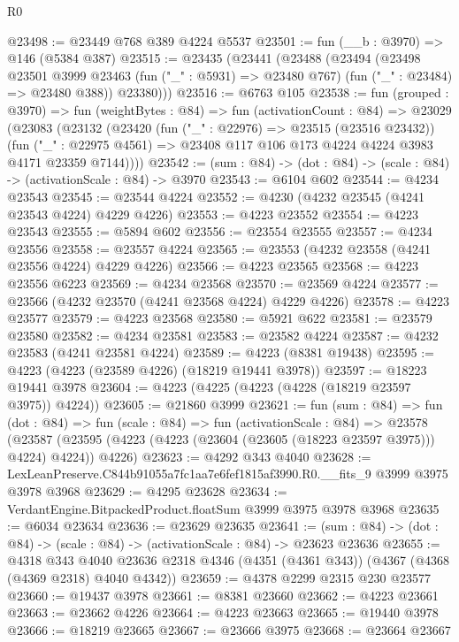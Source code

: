 \begin{lexlean}{R0}
\begin{coremodule}
@23498 := @23449 @768 @389 @4224 @5537
@23501 := fun (__b : @3970) => @146 (@5384 @387)
@23515 := @23435
    (@23441
      (@23488
        (@23494
          (@23498
            @23501
            @3999
            @23463
            (fun ("_" : @5931) => @23480 @767)
            (fun ("_" : @23484) => @23480 @388))
          @23380)))
@23516 := @6763 @105
@23538 := fun (grouped : @3970) =>
  fun (weightBytes : @84) =>
  fun (activationCount : @84) =>
  @23029
    (@23083
      (@23132
        (@23420
          (fun ("_" : @22976) => @23515 (@23516 @23432))
          (fun ("_" : @22975 @4561) =>
          @23408 @117 @106 @173 @4224 @4224 @3983 @4171 @23359 @7144))))
@23542 := (sum : @84) -> (dot : @84) -> (scale : @84) -> (activationScale : @84) -> @3970
@23543 := @6104 @602
@23544 := @4234 @23543
@23545 := @23544 @4224
@23552 := @4230 (@4232 @23545 (@4241 @23543 @4224) @4229 @4226)
@23553 := @4223 @23552
@23554 := @4223 @23543
@23555 := @5894 @602
@23556 := @23554 @23555
@23557 := @4234 @23556
@23558 := @23557 @4224
@23565 := @23553 (@4232 @23558 (@4241 @23556 @4224) @4229 @4226)
@23566 := @4223 @23565
@23568 := @4223 @23556 @6223
@23569 := @4234 @23568
@23570 := @23569 @4224
@23577 := @23566 (@4232 @23570 (@4241 @23568 @4224) @4229 @4226)
@23578 := @4223 @23577
@23579 := @4223 @23568
@23580 := @5921 @622
@23581 := @23579 @23580
@23582 := @4234 @23581
@23583 := @23582 @4224
@23587 := @4232 @23583 (@4241 @23581 @4224)
@23589 := @4223 (@8381 @19438)
@23595 := @4223 (@4223 (@23589 @4226) (@18219 @19441 @3978))
@23597 := @18223 @19441 @3978
@23604 := @4223 (@4225 (@4223 (@4228 (@18219 @23597 @3975)) @4224))
@23605 := @21860 @3999
@23621 := fun (sum : @84) =>
  fun (dot : @84) =>
  fun (scale : @84) =>
  fun (activationScale : @84) =>
  @23578 (@23587 (@23595 (@4223 (@4223 (@23604 (@23605 (@18223 @23597 @3975))) @4224) @4224)) @4226)
@23623 := @4292 @343 @4040
@23628 := LexLeanPreserve.C844b91055a7fc1aa7e6fef1815af3990.R0.__fits_9 @3999 @3975 @3978 @3968
@23629 := @4295 @23628
@23634 := VerdantEngine.BitpackedProduct.floatSum @3999 @3975 @3978 @3968
@23635 := @6034 @23634
@23636 := @23629 @23635
@23641 := (sum : @84) -> (dot : @84) -> (scale : @84) -> (activationScale : @84) -> @23623 @23636
@23655 := @4318
    @343
    @4040
    @23636
    @2318
    @4346
    (@4351 (@4361 @343))
    (@4367 (@4368 (@4369 @2318) @4040 @4342))
@23659 := @4378 @2299 @2315 @230 @23577
@23660 := @19437 @3978
@23661 := @8381 @23660
@23662 := @4223 @23661
@23663 := @23662 @4226
@23664 := @4223 @23663
@23665 := @19440 @3978
@23666 := @18219 @23665
@23667 := @23666 @3975
@23668 := @23664 @23667

\end{coremodule}
\end{lexlean}
